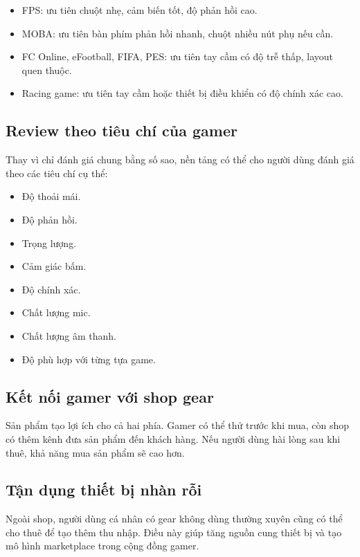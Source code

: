 \begin{itemize}
    \item FPS: ưu tiên chuột nhẹ, cảm biến tốt, độ phản hồi cao.
    \item MOBA: ưu tiên bàn phím phản hồi nhanh, chuột nhiều nút phụ nếu cần.
    \item FC Online, eFootball, FIFA, PES: ưu tiên tay cầm có độ trễ thấp, layout quen thuộc.
    \item Racing game: ưu tiên tay cầm hoặc thiết bị điều khiển có độ chính xác cao.
\end{itemize}

\subsection{Review theo tiêu chí của gamer}

Thay vì chỉ đánh giá chung bằng số sao, nền tảng có thể cho người dùng đánh giá theo các tiêu chí cụ thể:

\begin{itemize}
    \item Độ thoải mái.
    \item Độ phản hồi.
    \item Trọng lượng.
    \item Cảm giác bấm.
    \item Độ chính xác.
    \item Chất lượng mic.
    \item Chất lượng âm thanh.
    \item Độ phù hợp với từng tựa game.
\end{itemize}

\subsection{Kết nối gamer với shop gear}

Sản phẩm tạo lợi ích cho cả hai phía. Gamer có thể thử trước khi mua, còn shop có thêm kênh đưa sản phẩm đến khách hàng. Nếu người dùng hài lòng sau khi thuê, khả năng mua sản phẩm sẽ cao hơn.

\subsection{Tận dụng thiết bị nhàn rỗi}

Ngoài shop, người dùng cá nhân có gear không dùng thường xuyên cũng có thể cho thuê để tạo thêm thu nhập. Điều này giúp tăng nguồn cung thiết bị và tạo mô hình marketplace trong cộng đồng gamer.

